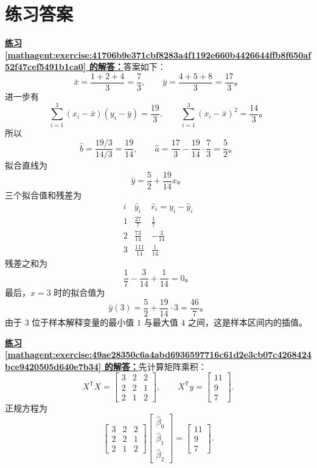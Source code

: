 \documentclass[UTF8,fontset=fandol,11pt]{ctexart}
\begin{document}
\section*{练习答案}
\par\noindent\textbf{\hyperref[mathagent:exercise:41706b9e371cbf8283a4f1192e660b4426644ffb8f650af52f47cef5491b1ca0]{练习 \ref*{mathagent:exercise:41706b9e371cbf8283a4f1192e660b4426644ffb8f650af52f47cef5491b1ca0} 的解答：}}答案如下：
\[
\bar x=\frac{1+2+4}{3}=\frac73,
\qquad
\bar y=\frac{4+5+8}{3}=\frac{17}{3}\text{。}
\]
进一步有
\[
\sum_{i=1}^{3}(x_i-\bar x)(y_i-\bar y)=\frac{19}{3},
\qquad
\sum_{i=1}^{3}(x_i-\bar x)^2=\frac{14}{3}\text{。}
\]
所以
\[
\hat b=\frac{19/3}{14/3}=\frac{19}{14},
\qquad
\hat a=\frac{17}{3}-\frac{19}{14}\cdot\frac73=\frac52\text{。}
\]
拟合直线为
\[
\hat y=\frac52+\frac{19}{14}x\text{。}
\]
三个拟合值和残差为
\[
\begin{array}{c|c|c}
 i&\hat y_i&\hat e_i=y_i-\hat y_i\\ \hline
 1&\frac{27}{7}&\frac17\\
 2&\frac{73}{14}&-\frac{3}{14}\\
 3&\frac{111}{14}&\frac{1}{14}
\end{array}
\]
残差之和为
\[
\frac17-\frac{3}{14}+\frac{1}{14}=0\text{。}
\]
最后，$x=3$ 时的拟合值为
\[
\hat y(3)=\frac52+\frac{19}{14}\cdot3=\frac{46}{7}\text{。}
\]
由于 $3$ 位于样本解释变量的最小值 $1$ 与最大值 $4$ 之间，这是样本区间内的插值。\par
\par\noindent\textbf{\hyperref[mathagent:exercise:49ae28350c6a4abd6936597716c61d2e3cb07c4268424bce9420505d640e7b34]{练习 \ref*{mathagent:exercise:49ae28350c6a4abd6936597716c61d2e3cb07c4268424bce9420505d640e7b34} 的解答：}}先计算矩阵乘积：
\[
X^{\mathsf T}X=
\begin{bmatrix}3&2&2\\2&2&1\\2&1&2\end{bmatrix},
\qquad
X^{\mathsf T}y=
\begin{bmatrix}11\\9\\7\end{bmatrix}.
\]
正规方程为
\[
\begin{bmatrix}3&2&2\\2&2&1\\2&1&2\end{bmatrix}
\begin{bmatrix}\hat\beta_0\\\hat\beta_1\\\hat\beta_2\end{bmatrix}
=
\begin{bmatrix}11\\9\\7\end{bmatrix}.
\]
\end{document}
